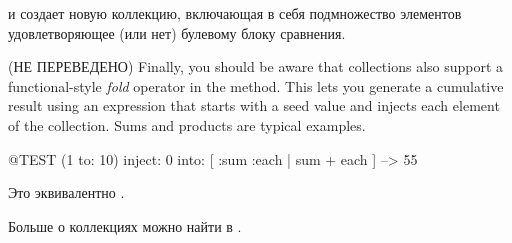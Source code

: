 \documentclass[a4paper,10pt,twoside]{book}
\begin{document}
 и  создает новую коллекцию, включающая в себя подмножество элементов удовлетворяющее (или нет) булевому блоку сравнения.



(НЕ ПЕРЕВЕДЕНО) Finally, you should be aware that collections also support a functional-style \emph{fold} operator in the  method.
This lets you generate a cumulative result using an expression that starts with a seed value and injects each element of the collection.
Sums and products are typical examples.

\begin{code}{@TEST}
(1 to: 10) inject: 0 into: [ :sum :each | sum + each ] --> 55
\end{code}

\noindent


Это эквивалентно .


Больше о коллекциях можно найти в .

\end{document}

